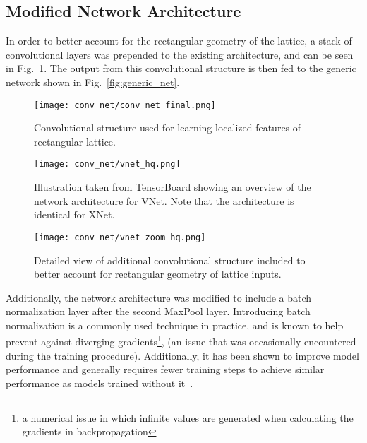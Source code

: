 \documentclass[../main.tex]{subfiles}
\begin{document}
\subsection{Modified Network Architecture}%
\label{subsec:l2hmc_modified_network}
%
In order to better account for the rectangular geometry of the lattice, a stack
of convolutional layers was prepended to the existing architecture, and can be
seen in Fig.~\ref{fig:conv_net}. The output from this convolutional structure
is then fed to the generic network shown in Fig.~\ref{fig:generic_net}.
%
\begin{figure}[htpb] 
  \centering
  \texttt{[image: conv\_net/conv\_net\_final.png]}
  \caption{Convolutional structure used for learning localized features of
  rectangular lattice.}%
\label{fig:conv_net} 
\end{figure}
%
\begin{figure}[htpb] 
  \centering
  \texttt{[image: conv\_net/vnet\_hq.png]}
  \caption{Illustration taken from TensorBoard showing an overview of the
  network architecture for VNet. Note that the architecture is identical for
XNet.} \vspace{12pt}
\texttt{[image: conv\_net/vnet\_zoom\_hq.png]}
\caption{Detailed view of additional convolutional structure included to better
account for rectangular geometry of lattice inputs.} \end{figure}
%
Additionally, the network architecture was modified to include a batch
normalization layer after the second MaxPool layer.
%
Introducing batch normalization is a commonly used technique in practice, and
is known to help prevent against diverging gradients\footnote{a numerical issue
in which infinite values are generated when calculating the gradients in
backpropagation}, (an issue that was occasionally encountered during the
training procedure).
%
Additionally, it has been shown to improve model performance and generally
requires fewer training steps to achieve similar performance as models trained
without it~\cite{Ioffe_Szegedy_2015}.
%
\end{document}
